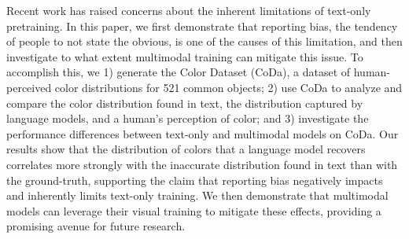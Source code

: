 Recent work has raised concerns about the inherent limitations of text-only pretraining. In this paper, we first demonstrate that reporting bias, the tendency of people to not state the obvious, is one of the causes of this limitation, and then investigate to what extent multimodal training can mitigate this issue. To accomplish this, we 1) generate the Color Dataset (CoDa), a dataset of human-perceived color distributions for 521 common objects; 2) use CoDa to analyze and compare the color distribution found in text, the distribution captured by language models, and a human's perception of color; and 3) investigate the performance differences between text-only and multimodal models on CoDa. Our results show that the distribution of colors that a language model recovers correlates more strongly with the inaccurate distribution found in text than with the ground-truth, supporting the claim that reporting bias negatively impacts and inherently limits text-only training. We then demonstrate that multimodal models can leverage their visual training to mitigate these effects, providing a promising avenue for future research.
